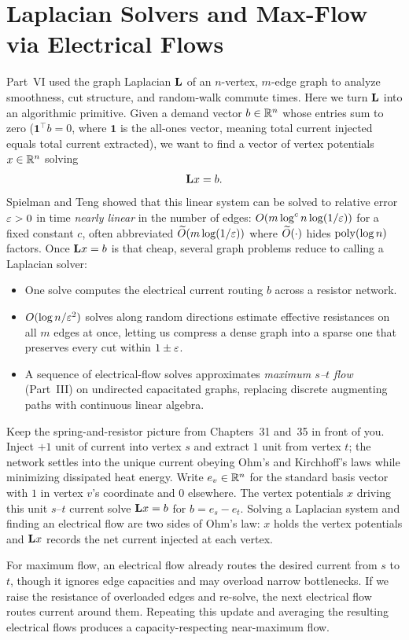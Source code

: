 \chapter{Laplacian Solvers and Max-Flow via Electrical Flows}
\label{ch:laplacian-solvers}

Part~VI used the graph Laplacian $\mathbf{L}$ of an $n$-vertex, $m$-edge graph to analyze smoothness, cut structure, and random-walk commute times. Here we turn $\mathbf{L}$ into an algorithmic primitive. Given a demand vector $b \in \mathbb{R}^n$ whose entries sum to zero ($\mathbf{1}^\top b = 0$, where $\mathbf{1}$ is the all-ones vector, meaning total current injected equals total current extracted), we want to find a vector of vertex potentials $x \in \mathbb{R}^n$ solving
\[
  \mathbf{L} x = b .
\]
Spielman and Teng showed that this linear system can be solved to relative error $\varepsilon > 0$ in time \emph{nearly linear} in the number of edges: $O(m \log^c n \log(1/\varepsilon))$ for a fixed constant $c$, often abbreviated $\widetilde{O}(m \log(1/\varepsilon))$ where $\widetilde{O}(\cdot)$ hides $\operatorname{poly}(\log n)$ factors. Once $\mathbf{L} x = b$ is that cheap, several graph problems reduce to calling a Laplacian solver:
\begin{itemize}
  \item One solve computes the electrical current routing $b$ across a resistor network.
  \item $O(\log n / \varepsilon^2)$ solves along random directions estimate effective resistances on all $m$ edges at once, letting us compress a dense graph into a sparse one that preserves every cut within $1 \pm \varepsilon$.
  \item A sequence of electrical-flow solves approximates \emph{maximum $s$--$t$ flow} (Part~III) on undirected capacitated graphs, replacing discrete augmenting paths with continuous linear algebra.
\end{itemize}

\begin{intuitionbox}
Keep the spring-and-resistor picture from Chapters~31 and~35 in front of you. Inject $+1$ unit of current into vertex $s$ and extract $1$ unit from vertex $t$; the network settles into the unique current obeying Ohm's and Kirchhoff's laws while minimizing dissipated heat energy. Write $e_v \in \mathbb{R}^n$ for the standard basis vector with $1$ in vertex $v$'s coordinate and $0$ elsewhere. The vertex potentials $x$ driving this unit $s$--$t$ current solve $\mathbf{L} x = b$ for $b = e_s - e_t$. Solving a Laplacian system and finding an electrical flow are two sides of Ohm's law: $x$ holds the vertex potentials and $\mathbf{L} x$ records the net current injected at each vertex.

For maximum flow, an electrical flow already routes the desired current from $s$ to $t$, though it ignores edge capacities and may overload narrow bottlenecks. If we raise the resistance of overloaded edges and re-solve, the next electrical flow routes current around them. Repeating this update and averaging the resulting electrical flows produces a capacity-respecting near-maximum flow.
\end{intuitionbox}

